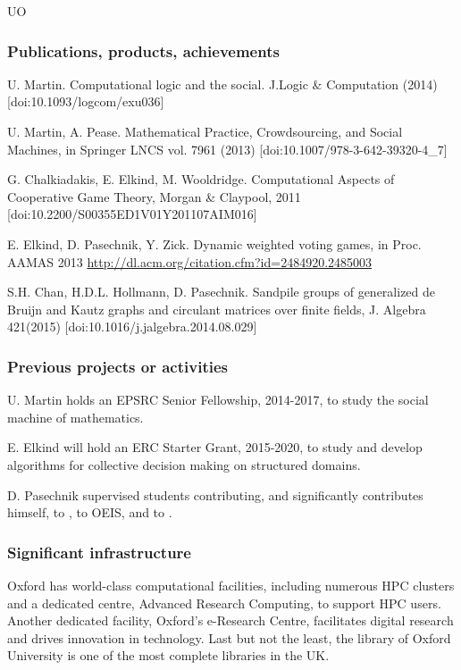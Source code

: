 \begin{sitedescription}{UO}
\subsubsection*{Publications, products, achievements}
\begin{compactenum}
\item U. Martin. Computational logic and the social. J.Logic \& Computation (2014) [doi:10.1093/logcom/exu036]
\item U. Martin, A. Pease. Mathematical Practice, Crowdsourcing, and Social Machines, in Springer LNCS vol. 7961 (2013) [doi:10.1007/978-3-642-39320-4\_7]
\item G. Chalkiadakis, E. Elkind, M. Wooldridge. Computational Aspects of Cooperative Game Theory, Morgan \& Claypool, 2011 [doi:10.2200/S00355ED1V01Y201107AIM016]
\item E. Elkind, D. Pasechnik, Y. Zick. Dynamic weighted voting games, in Proc. AAMAS 2013 
\url{http://dl.acm.org/citation.cfm?id=2484920.2485003}
\item S.H. Chan, H.D.L. Hollmann, D. Pasechnik. Sandpile groups of generalized de Bruijn and Kautz graphs and circulant matrices over finite fields,
J. Algebra 421(2015) [doi:10.1016/j.jalgebra.2014.08.029]
\end{compactenum}

\subsubsection*{Previous projects or activities}

\begin{compactenum}
\item %
U. Martin holds an EPSRC Senior Fellowship, 2014-2017, to study the social machine of mathematics.
\item E. Elkind will hold an ERC Starter Grant, 2015-2020, to study and develop algorithms for collective decision
making on structured domains.
\item D. Pasechnik supervised  students contributing,  and significantly contributes himself, to \Sage, to OEIS, and to \GAP.
\end{compactenum}

\subsubsection*{Significant infrastructure}
Oxford has world-class computational facilities, including numerous HPC clusters and a dedicated
centre, Advanced Research Computing, to support HPC users.
Another dedicated facility, Oxford's e-Research Centre, facilitates 
digital research and drives innovation in technology. Last but not the least,
the library of Oxford University is one of the most complete libraries in the UK.
\end{sitedescription}







